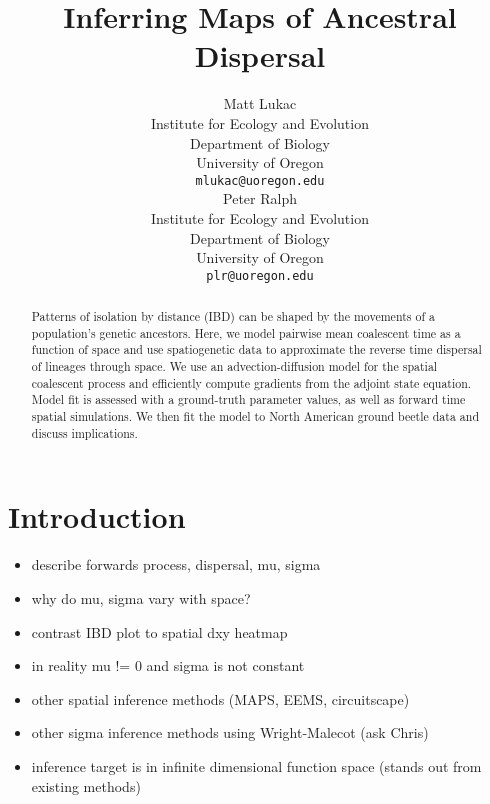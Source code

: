 \documentclass{article}
\title{Inferring Maps of Ancestral Dispersal}
\author{{Matt Lukac} \\
	Institute for Ecology and Evolution\\
	Department of Biology\\
	University of Oregon\\
	\texttt{mlukac@uoregon.edu} \\
	\And
	{Peter Ralph} \\
	Institute for Ecology and Evolution\\
	Department of Biology\\
	University of Oregon\\
	\texttt{plr@uoregon.edu} \\
}
\begin{document}
	\maketitle
	
	\begin{abstract}
		Patterns of isolation by distance (IBD) can be shaped by
		the movements of a population's genetic ancestors.
		Here, we model pairwise mean coalescent time as a function of space
		and use spatiogenetic data to approximate the reverse time
		dispersal of lineages through space.
		We use an advection-diffusion model for the spatial coalescent process
		and efficiently compute gradients from the adjoint state equation.
		Model fit is assessed with a ground-truth parameter values, 
		as well as forward time spatial simulations.
		We then fit the model to North American ground beetle data
		and discuss implications.
	\end{abstract}
	
	
	
	
	\section{Introduction}
	\begin{itemize}
		\item describe forwards process, dispersal, mu, sigma
		\item why do mu, sigma vary with space?
		\item contrast IBD plot to spatial dxy heatmap
		\item in reality mu != 0 and sigma is not constant
		\item other spatial inference methods (MAPS, EEMS, circuitscape)
		\item other sigma inference methods using Wright-Malecot (ask Chris)
		\item inference target is in infinite dimensional function space (stands out from existing methods)
	\end{itemize}
	
\end{document}
